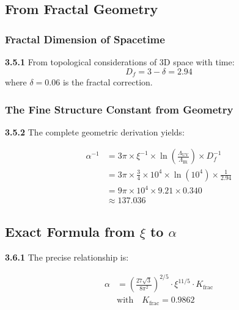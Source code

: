 \documentclass[12pt,a4paper]{article}
\newcommand{\xipar}{\xi}
\begin{document}
	\subsection{From Fractal Geometry}
	
	\subsubsection{Fractal Dimension of Spacetime}
	
	\noindent \textbf{3.5.1} From topological considerations of 3D space with time:
	\begin{equation}
		D_f = 3 - \delta = 2.94
	\end{equation}
	where $\delta = 0.06$ is the fractal correction.
	
	\subsubsection{The Fine Structure Constant from Geometry}
	
	\noindent \textbf{3.5.2} The complete geometric derivation yields:
	\begin{keyresult}
		\begin{align}
			\alpha^{-1} &= 3\pi \times \xipar^{-1} \times \ln\left(\frac{\Lambda_{\text{UV}}}{\Lambda_{\text{IR}}}\right) \times D_f^{-1} \\
			&= 3\pi \times \frac{3}{4} \times 10^{4} \times \ln(10^{4}) \times \frac{1}{2.94} \\
			&= 9\pi \times 10^{4} \times 9.21 \times 0.340 \\
			&\approx 137.036
		\end{align}
	\end{keyresult}
	
	\subsection{Exact Formula from $\xipar$ to $\alpha$}
	
	\noindent \textbf{3.6.1} The precise relationship is:
	\begin{keyresult}
		\begin{align}
			\alpha &= \left( \frac{27 \sqrt{3}}{8 \pi^2} \right)^{2/5} \cdot \xipar^{11/5} \cdot K_{\text{frac}} \\
			&\text{with} \quad K_{\text{frac}} = 0.9862
		\end{align}
	\end{keyresult}
	
\end{document}
